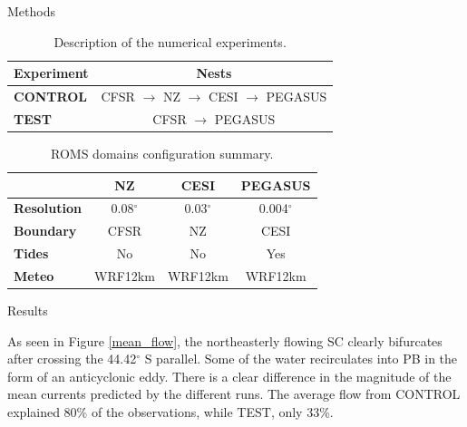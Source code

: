 \documentclass[final]{beamer}
\newlength{\onecolwid}
\newlength{\twocolwid}
\begin{document}
\begin{frame}[t]
\begin{columns}[t]
\begin{column}{\twocolwid}
\begin{columns}[t,totalwidth=\twocolwid]
\begin{column}{\onecolwid}
\begin{block}{Methods}
            \begin{small}

            \begin{table}
            \vspace{2ex}
            \begin{tabular}{l c}
            \toprule
            \textbf{Experiment} & \textbf{Nests} \\
            \midrule
            \textbf{CONTROL} & CFSR $\rightarrow$ NZ $\rightarrow$ CESI $\rightarrow$ PEGASUS \\
            \textbf{TEST}    & CFSR $\rightarrow$ PEGASUS \\
            \bottomrule
            \end{tabular}
            \caption{\label{experiments} Description of the numerical experiments.}
            \end{table}


            \begin{table}
            \vspace{2ex}
            \begin{tabular}{l c c c}
            \toprule
                                & \textbf{NZ}  & \textbf{CESI} & \textbf{PEGASUS} \\
            \midrule
            \textbf{Resolution} & 0.08$^\circ$ & 0.03$^\circ$ & 0.004$^\circ$ \\
            \textbf{Boundary}   & CFSR         & NZ           & CESI          \\
            \textbf{Tides}      & No           & No           & Yes           \\
            \textbf{Meteo}      & WRF12km      & WRF12km      & WRF12km        \\
            \bottomrule
            \end{tabular}
            \caption{\label{roms_configs} ROMS domains configuration summary.}
            \end{table}

            \end{small}


            \end{block}

            \begin{block}{Results}

            As seen in Figure \ref{mean_flow}, the northeasterly flowing SC clearly bifurcates after crossing the 44.42$^\circ$ S parallel. Some of the water recirculates into PB in the form of an anticyclonic eddy. There is a clear difference in the magnitude of the mean currents predicted by the different runs. The average flow from CONTROL explained 80\% of the observations, while TEST, only 33\%. 


\end{block}
\end{column}
\end{columns}
\end{column}
\end{columns}
\end{frame}
\end{document}
